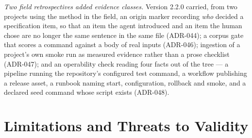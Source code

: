 \documentclass[11pt]{article}
\begin{document}
\emph{Two field retrospectives added evidence classes.} Version 2.2.0 carried, from two
projects using the method in the field, an origin marker recording \emph{who} decided a
specification item, so that an item the agent introduced and an item the human chose are
no longer the same sentence in the same file (ADR-044); a corpus gate that scores a
command against a body of real inputs (ADR-046); ingestion of a project's own smoke run
as measured evidence rather than a prose checklist (ADR-047); and an operability check
reading four facts out of the tree --- a pipeline running the repository's configured
test command, a workflow publishing a release asset, a runbook naming start,
configuration, rollback and smoke, and a declared seed command whose script exists
(ADR-048).

\section{Limitations and Threats to Validity}\label{sec:limitations}
\end{document}
